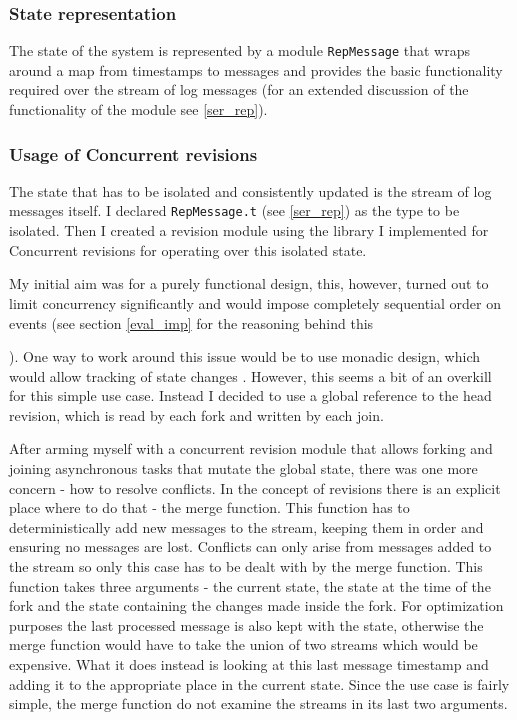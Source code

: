 \documentclass[12pt,twoside,notitlepage]{report}
\begin{document}
{{\subsubsection{State representation}
The state of the system is represented by a module {\tt RepMessage} that wraps around a map from timestamps to messages and provides the basic functionality required over the stream of log messages (for an extended discussion of the functionality of the module see \ref{ser_rep}). 

\subsubsection{Usage of Concurrent revisions}
\label{log_usage}
The state that has to be isolated and consistently updated is the stream of log messages itself. I declared {\tt RepMessage.t} (see \ref{ser_rep}) as the type to be isolated. Then I created a revision module using the library I implemented for Concurrent revisions for operating over this isolated state. 

My initial aim was for a purely functional design, this, however, turned out to limit concurrency significantly and would impose completely sequential order on events (see section \ref{eval_imp} for the reasoning behind this}). One way to work around this issue would be to use monadic design, which would allow tracking of state changes \cite{haskell}. However, this seems a bit of an overkill for this simple use case. Instead I decided to use a global reference to the head revision, which is read by each fork and written by each join.

After arming myself with a concurrent revision module that allows forking and joining asynchronous tasks that mutate the global state, there was one more concern - how to resolve conflicts. In the concept of revisions there is an explicit place where to do that - the merge function. This function has to deterministically add new messages to the stream, keeping them in order and ensuring no messages are lost. Conflicts can only arise from messages added to the stream so only this case has to be dealt with by the merge function. This function takes three arguments - the current state, the state at the time of the fork and the state containing the changes made inside the fork. For optimization purposes the last processed message is also kept with the state, otherwise the merge function would have to take the union of two streams which would be expensive. What it does instead is looking at this last message timestamp and adding it to the appropriate place in the current state. Since the use case is fairly simple, the merge function do not examine the streams in its last two arguments.

}
\end{document}
